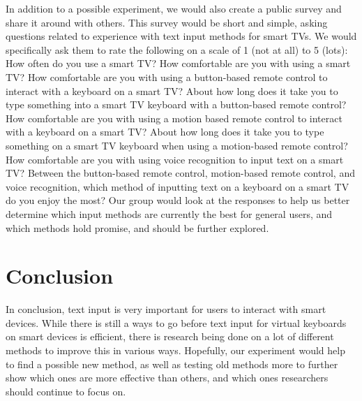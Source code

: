 \documentclass{vgtc}                          %
\begin{document}
In addition to a possible experiment, we would also create a public survey and share it around with others. This survey would be short and simple, asking questions related to experience with text input methods for smart TVs. We would specifically ask them to rate the following on a scale of 1 (not at all) to 5 (lots): How often do you use a smart TV? How comfortable are you with using a smart TV? How comfortable are you with using a button-based remote control to interact with a keyboard on a smart TV? About how long does it take you to type something into a smart TV keyboard with a button-based remote control? How comfortable are you with using a motion based remote control to interact with a keyboard on a smart TV? About how long does it take you to type something on a smart TV keyboard when using a motion-based remote control? How comfortable are you with using voice recognition to input text on a smart TV? Between the button-based remote control, motion-based remote control, and voice recognition, which method of inputting text  on a keyboard on a smart TV do you enjoy the most? Our group would look at the responses to help us better determine which input methods are currently the best for general users, and which methods hold promise, and should be further explored. 

\section{Conclusion}
In conclusion, text input is very important for users to interact with smart devices. While there is still a ways to go before text input for virtual keyboards on smart devices is efficient, there is research being done on a lot of different methods to improve this in various ways. Hopefully, our experiment would help to find a possible new method, as well as testing old methods more to further show which ones are more effective than others, and which ones researchers should continue to focus on. 



%

%
%
%


\end{document}
